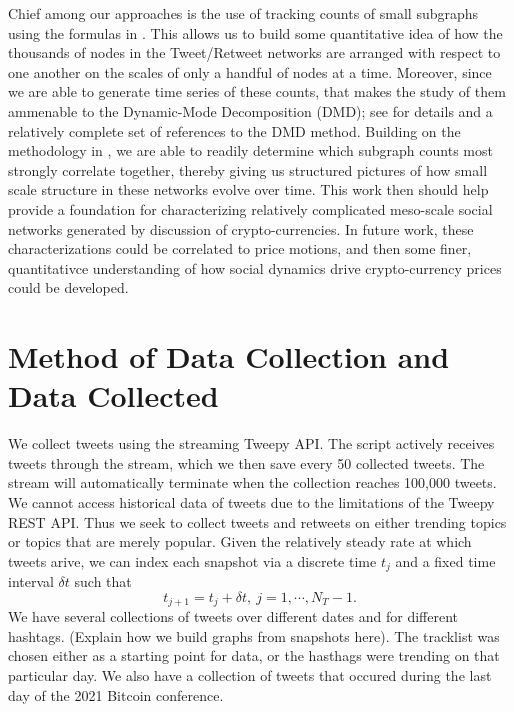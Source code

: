 \documentclass[a4paper,11pt]{article}
\begin{document}
Chief among our approaches is the use of tracking counts of small subgraphs using the formulas in \cite{alon}.  This allows us to build some quantitative idea of how the thousands of nodes in the Tweet/Retweet networks are arranged with respect to one another on the scales of only a handful of nodes at a time.  Moreover, since we are able to generate time series of these counts, that makes the study of them ammenable to the Dynamic-Mode Decomposition (DMD); see \cite{kutz} for details and a relatively complete set of references to the DMD method.  Building on the methodology in \cite{curtis2021detection}, we are able to readily determine which subgraph counts most strongly correlate together, thereby giving us structured pictures of how small scale structure in these networks evolve over time.  This work then should help provide a foundation for characterizing relatively complicated meso-scale social networks generated by discussion of crypto-currencies.  In future work, these characterizations could be correlated to price motions, and then some finer, quantitativce understanding of how social dynamics drive crypto-currency prices could be developed.  
\section{Method of Data Collection and Data Collected}
We collect tweets using the streaming Tweepy API. The script actively receives tweets through the stream, which we then save every 50 collected tweets. The stream will automatically terminate when the collection reaches 100,000 tweets. We cannot access historical data of tweets due to the limitations of the Tweepy REST API. Thus we seek to collect tweets and retweets on either trending topics or topics that are merely popular.  Given the relatively steady rate at which tweets arive, we can index each snapshot via a discrete time $t_{j}$ and a fixed time interval $\delta t$ such that 
\[
t_{j+1} = t_{j} + \delta t, ~ j=1,\cdots, N_{T}-1.
\]
We have several collections of tweets over different dates and for different hashtags.  (Explain how we build graphs from snapshots here).  The tracklist was chosen either as a starting point for data, or the hasthags were trending on that particular day.  We also have a collection of tweets that occured during the last day of the 2021 Bitcoin conference.
\end{document}
